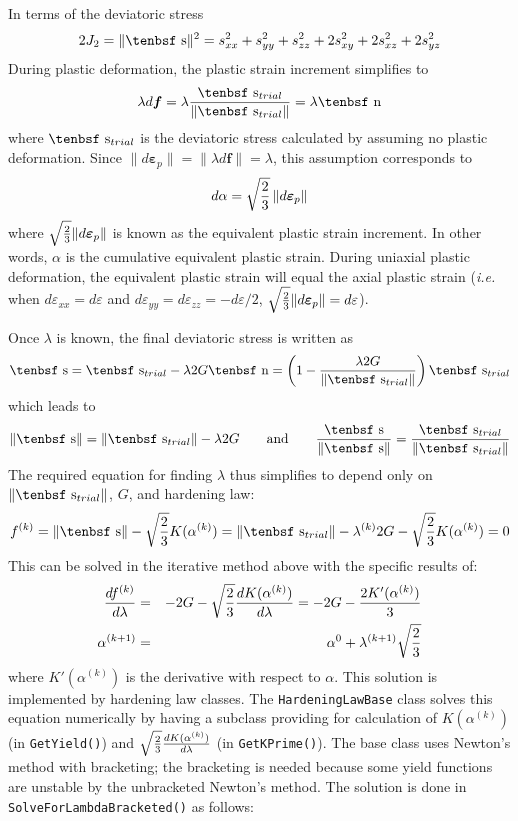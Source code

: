 \documentclass[11pt]{article}
\renewcommand{\vec}[1]{\boldsymbol{#1}}
\def\dev{\hbox{\tenbsf s}}
\def\ndev{\hbox{\tenbsf n}}
\def\code#1{{\small\tt #1}}
\def\dpl{d \vec{\varepsilon}_{p}}
\def\df{d \vec{f}}
\begin{document}
In terms of the deviatoric stress
\begin{equation}
     2J_2 = \|\dev\|^2 =  s_{xx}^2 + s_{yy}^2  + s_{zz}^2 + 2s_{xy}^2 + 2s_{xz}^2 + 2s_{yz}^2 \\
 \end{equation}
During plastic deformation, 
the plastic strain increment simplifies to
\begin{equation}
     \lambda \df = \lambda {\dev_{trial}\over \|\dev_{trial}\|} = \lambda \ndev
\end{equation}
where $ \dev_{trial}$ is the deviatoric stress calculated by assuming no plastic deformation.
Since $\|\dpl\| = \|\lambda \df\| = \lambda$, this assumption corresponds to
\begin{equation}
     d\alpha = \sqrt{2\over3}\thinspace \|\dpl\|
\end{equation}
where $\sqrt{2\over3}\|\dpl\|$ is known as the equivalent plastic strain increment. In other words, $\alpha$ is the cumulative equivalent plastic strain. During uniaxial plastic deformation, the equivalent plastic strain will equal the axial plastic strain ({\em i.e.} when $d\varepsilon_{xx}=d\varepsilon$ and $d\varepsilon_{yy}=d\varepsilon_{zz} = -d\varepsilon/2$, $\sqrt{2\over3}\|\dpl\| = d\varepsilon$).

Once $\lambda$ is known, the final deviatoric stress is written as
\begin{equation}
        \dev = \dev_{trial} - \lambda 2G\ndev = \left(1- {\lambda 2G\over \|\dev_{trial}\|}\right) \dev_{trial}
\end{equation}
which leads to
\begin{equation}
         \|\dev\| =  \|\dev_{trial}\| - \lambda 2G \qquad {\rm and} \qquad 
         {\dev\over \|\dev\|} = {\dev_{trial}\over \|\dev_{trial}\|}
\end{equation}
The required equation for finding $\lambda$ thus simplifies to depend only on $\|\dev_{trial}\|$, $G$, and hardening law:
\begin{equation}
      f^{(k)} = \|\dev\| -  \sqrt{2\over3} K(\alpha^{(k)}) = \|\dev_{trial}\| - \lambda^{(k)} 2G -  \sqrt{2\over3} K(\alpha^{(k)}) = 0
\end{equation}
This can be solved in the iterative method above with the specific results of:
\begin{eqnarray}
        {df^{(k)}\over d\lambda} & = & -2G - \sqrt{2\over3}{dK(\alpha^{(k)})\over d\lambda}  = -2G - {2K'(\alpha^{(k)})\over 3} \\
        \alpha^{(k+1)} & = & \alpha^{0} +  \lambda^{(k+1)} \sqrt{2\over3}
\end{eqnarray}
where $K'(\alpha^{(k)})$ is the derivative with respect to $\alpha$. This solution is implemented by hardening law classes. The {\tt HardeningLawBase} class solves this equation numerically by having a subclass providing for calculation of $K(\alpha^{(k)})$ (in \code{GetYield()}) and $\sqrt{2\over3}{dK(\alpha^{(k)})\over d\lambda}$ (in \code{GetKPrime()}). The base class uses Newton's method with bracketing; the bracketing is needed because some yield functions are unstable by the unbracketed Newton's method. The solution is done in {\tt SolveForLambdaBracketed()} as follows:
\end{document}
